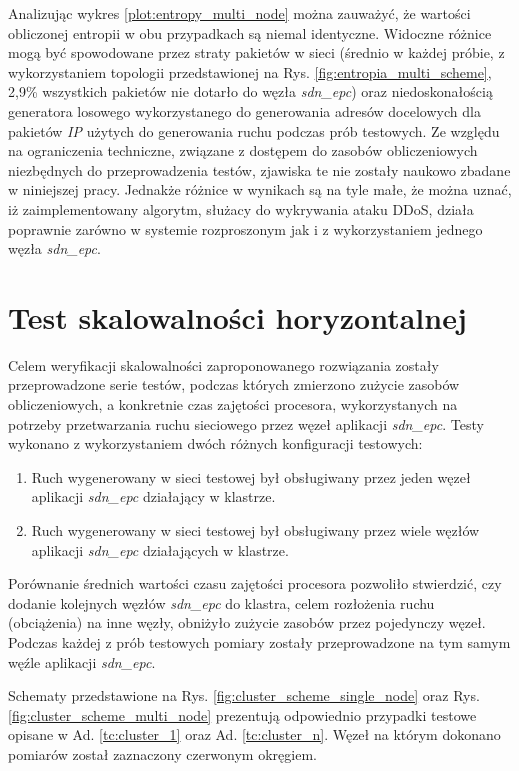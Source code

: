 Analizując wykres \ref{plot:entropy_multi_node} można zauważyć, że wartości
obliczonej entropii w obu przypadkach są niemal identyczne. Widoczne różnice
mogą być spowodowane przez straty pakietów w sieci (średnio w każdej próbie, z
wykorzystaniem topologii przedstawionej na Rys. \ref{fig:entropia_multi_scheme},
2,9\% wszystkich pakietów nie dotarło do węzła \textit{sdn\_epc}) oraz
niedoskonałością generatora losowego wykorzystanego do generowania adresów
docelowych dla pakietów \textit{IP} użytych do generowania ruchu podczas prób
testowych. Ze względu na ograniczenia techniczne, związane z dostępem do zasobów
obliczeniowych niezbędnych do przeprowadzenia testów, zjawiska te nie zostały
naukowo zbadane w niniejszej pracy. Jednakże różnice w wynikach są  na tyle
małe, że można uznać, iż zaimplementowany algorytm, służacy do wykrywania ataku
DDoS, działa poprawnie zarówno w systemie rozproszonym jak i z wykorzystaniem
jednego węzła \textit{sdn\_epc}.

\section{Test skalowalności horyzontalnej}

Celem weryfikacji skalowalności zaproponowanego rozwiązania zostały
przeprowadzone serie testów, podczas których zmierzono zużycie zasobów
obliczeniowych, a konkretnie czas zajętości procesora, wykorzystanych na
potrzeby przetwarzania ruchu sieciowego przez węzeł aplikacji \textit{sdn\_epc}.
Testy wykonano z wykorzystaniem dwóch różnych konfiguracji testowych:
\begin{enumerate}
  \item \label{tc:cluster_1} Ruch wygenerowany w sieci testowej był obsługiwany
    przez jeden węzeł aplikacji \textit{sdn\_epc} działający w klastrze.
  \item \label{tc:cluster_n} Ruch wygenerowany w sieci testowej był obsługiwany
    przez wiele węzłów aplikacji \textit{sdn\_epc} działających w klastrze.
\end{enumerate}

Porównanie średnich wartości czasu zajętości procesora pozwoliło stwierdzić,
czy dodanie kolejnych węzłów \textit{sdn\_epc} do klastra, celem rozłożenia
ruchu (obciążenia) na inne węzły, obniżyło zużycie zasobów przez pojedynczy
węzeł. Podczas każdej z prób testowych pomiary zostały przeprowadzone na tym
samym węźle aplikacji \textit{sdn\_epc}.

Schematy przedstawione na Rys. \ref{fig:cluster_scheme_single_node} oraz
Rys. \ref{fig:cluster_scheme_multi_node} prezentują odpowiednio przypadki
testowe opisane w Ad. \ref{tc:cluster_1} oraz Ad. \ref{tc:cluster_n}. Węzeł
na którym dokonano pomiarów został zaznaczony czerwonym okręgiem.
\newpage

